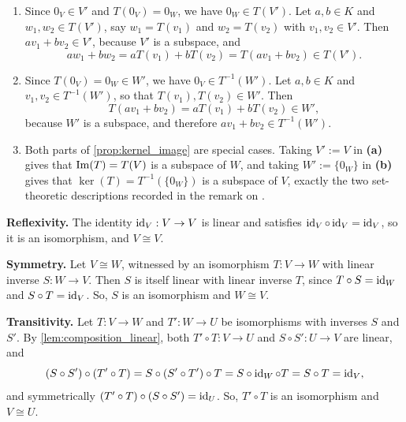 \begin{exercisesolution}
\label{sol:images_preimages_subspaces}
\begin{enumerate}[label=\textbf{(\alph*)}]
    \item Since $0_V \in V'$ and $T(0_V) = 0_W$, we have $0_W \in T(V')$. Let $a, b \in K$ and $w_1, w_2 \in T(V')$, say $w_1 = T(v_1)$ and $w_2 = T(v_2)$ with $v_1, v_2 \in V'$. Then $a v_1 + b v_2 \in V'$, because $V'$ is a subspace, and
    \[
    a w_1 + b w_2 = a T(v_1) + b T(v_2) = T(a v_1 + b v_2) \in T(V').
    \]
    \item Since $T(0_V) = 0_W \in W'$, we have $0_V \in T^{-1}(W')$. Let $a, b \in K$ and $v_1, v_2 \in T^{-1}(W')$, so that $T(v_1), T(v_2) \in W'$. Then
    \[
    T(a v_1 + b v_2) = a T(v_1) + b T(v_2) \in W',
    \]
    because $W'$ is a subspace, and therefore $a v_1 + b v_2 \in T^{-1}(W')$.
    \item Both parts of \cref{prop:kernel_image} are special cases. Taking $V' := V$ in \textbf{(a)} gives that $\operatorname{Im}(T) = T(V)$ is a subspace of $W$, and taking $W' := \{0_W\}$ in \textbf{(b)} gives that $\ker(T) = T^{-1}(\{0_W\})$ is a subspace of $V$, exactly the two set-theoretic descriptions recorded in the remark on .
\end{enumerate}
\end{exercisesolution}

\begin{exercisesolution}
\label{sol:iso_equivalence_relation}
\textbf{Reflexivity.} The identity $\operatorname{id}_V: V \to V$ is linear and satisfies $\operatorname{id}_V \circ \operatorname{id}_V = \operatorname{id}_V$, so it is an isomorphism, and $V \cong V$.

\textbf{Symmetry.} Let $V \cong W$, witnessed by an isomorphism $T: V \to W$ with linear inverse $S: W \to V$. Then $S$ is itself linear with linear inverse $T$, since $T \circ S = \operatorname{id}_W$ and $S \circ T = \operatorname{id}_V$. So, $S$ is an isomorphism and $W \cong V$.

\textbf{Transitivity.} Let $T: V \to W$ and $T': W \to U$ be isomorphisms with inverses $S$ and $S'$. By \cref{lem:composition_linear}, both $T' \circ T: V \to U$ and $S \circ S': U \to V$ are linear, and
\[
(S \circ S') \circ (T' \circ T) = S \circ (S' \circ T') \circ T = S \circ \operatorname{id}_W \circ T = S \circ T = \operatorname{id}_V,
\]
and symmetrically $(T' \circ T) \circ (S \circ S') = \operatorname{id}_U$. So, $T' \circ T$ is an isomorphism and $V \cong U$.
\end{exercisesolution}

